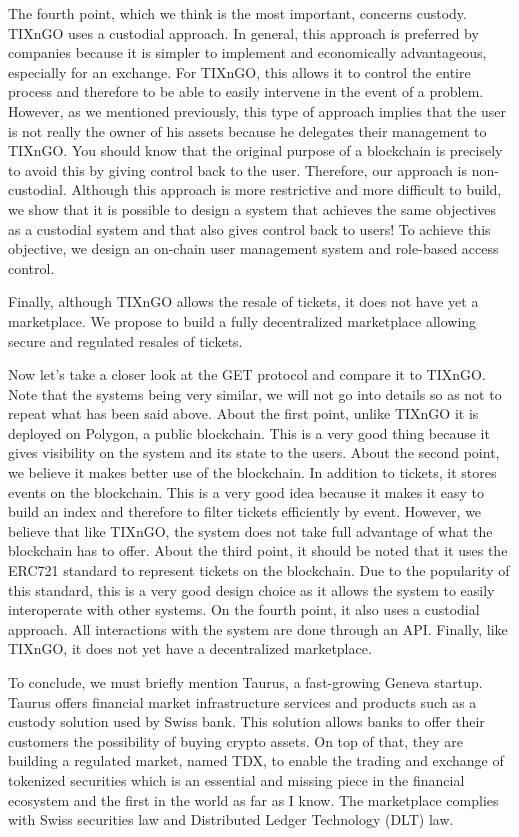 \documentclass[a4paper,11pt,oneside]{report}
\begin{document}
The fourth point, which we think is the most important, concerns custody. TIXnGO uses a custodial approach. In general, this approach is preferred by companies because it is simpler to implement and economically advantageous, especially for an exchange. For TIXnGO, this allows it to control the entire process and therefore to be able to easily intervene in the event of a problem. However, as we mentioned previously, this type of approach implies that the user is not really the owner of his assets because he delegates their management to TIXnGO. You should know that the original purpose of a blockchain is precisely to avoid this by giving control back to the user. Therefore, our approach is non-custodial. Although this approach is more restrictive and more difficult to build, we show that it is possible to design a system that achieves the same objectives as a custodial system and that also gives control back to users! To achieve this objective, we design an on-chain user management system and role-based access control.

Finally, although TIXnGO allows the resale of tickets, it does not have yet a marketplace. We propose to build a fully decentralized marketplace allowing secure and regulated resales of tickets.

Now let's take a closer look at the GET protocol and compare it to TIXnGO. Note that the systems being very similar, we will not go into details so as not to repeat what has been said above. About the first point, unlike TIXnGO it is deployed on Polygon, a public blockchain. This is a very good thing because it gives visibility on the system and its state to the users. About the second point, we believe it makes better use of the blockchain. In addition to tickets, it stores events on the blockchain. This is a very good idea because it makes it easy to build an index and therefore to filter tickets efficiently by event. However, we believe that like TIXnGO, the system does not take full advantage of what the blockchain has to offer. About the third point, it should be noted that it uses the ERC721 standard to represent tickets on the blockchain. Due to the popularity of this standard, this is a very good design choice as it allows the system to easily interoperate with other systems. On the fourth point, it also uses a custodial approach. All interactions with the system are done through an API. Finally, like TIXnGO, it does not yet have a decentralized marketplace.

To conclude, we must briefly mention Taurus, a fast-growing Geneva startup. Taurus offers financial market infrastructure services and products such as a custody solution used by Swiss bank. This solution allows banks to offer their customers the possibility of buying crypto assets. On top of that, they are building a regulated market, named TDX, to enable the trading and exchange of tokenized securities which is an essential and missing piece in the financial ecosystem and the first in the world as far as I know. The marketplace complies with Swiss securities law and Distributed Ledger Technology (DLT) law.
\end{document}
